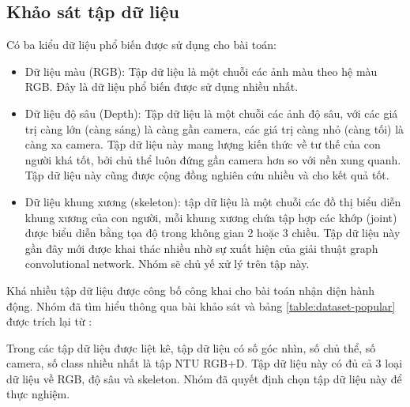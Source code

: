 \subsection{Khảo sát tập dữ liệu}

Có ba kiểu dữ liệu phổ biến được sử dụng cho bài toán:

\begin{itemize}
    \item Dữ liệu màu (RGB): Tập dữ liệu là một chuỗi các ảnh màu theo hệ màu RGB. Đây là dữ liệu phổ biến được sử dụng nhiều nhất.
    \item Dữ liệu độ sâu (Depth): Tập dữ liệu là một chuỗi các ảnh độ sâu, với các giá trị càng lớn (càng sáng) là càng gần camera, các giá trị càng nhỏ (càng tối) là càng xa camera. Tập dữ liệu này mang lượng kiến thức về tư thế của con người khá tốt, bởi chủ thể luôn đứng gần camera hơn so với nền xung quanh. Tập dữ liệu này cũng được cộng đồng nghiên cứu nhiều và cho kết quả tốt.
    \item Dữ liệu khung xương (skeleton): tập dữ liệu là một chuỗi các đồ thị biểu diễn khung xương của con người, mỗi khung xương chứa tập hợp các khớp (joint) được biểu diễn bằng tọa độ trong không gian 2 hoặc 3 chiều. Tập dữ liệu này gần đây mới được khai thác nhiều nhờ sự xuất hiện của giải thuật graph convolutional network. Nhóm sẽ chủ yế xử lý trên tập này.
\end{itemize}

Khá nhiều tập dữ liệu được công bố công khai cho bài toán nhận diện hành động. Nhóm đã tìm hiểu thông qua bài khảo sát \cite{zhang2019comprehensive} và bảng \ref{table:dataset-popular} được trích lại từ \cite{zhang2019comprehensive}:


Trong các tập dữ liệu được liệt kê, tập dữ liệu có số góc nhìn, số chủ thể, số camera, số class nhiều nhất là tập NTU RGB+D. Tập dữ liệu này có đủ cả 3 loại dữ liệu về RGB, độ sâu và skeleton. Nhóm đã quyết định chọn tập dữ liệu này để thực nghiệm.


